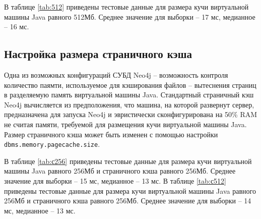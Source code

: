 В таблице \ref{tab:512} приведены тестовые данные для размера кучи виртуальной машины Java равного 512Мб. Среднее значение для выборки -- 17 мс, медианное -- 16 мс. 


\subsection{Настройка размера страничного кэша}

Одна из возможных конфигураций СУБД Neo4j -- возможность контроля количество паямти, используемое для  кэширования файлов -- вытеснения страниц в разделяемую память виртуальной машины Java. Стандартный страничный кэш Neo4j вычисляется из предположения, что машина, на которой развернут сервер, предназначена для запуска Neo4j и эвристически сконфигурирована на 50\% RAM не считая памяти, требуемой для размещения кучи виртуальной машины Java. Размер страничного кэша может быть изменен с помощью настройки \lstinline|dbms.memory.pagecache.size|.

В таблице \ref{tab:с256} приведены тестовые данные для размера кучи виртуальной машины Java равного 256Мб и страничного кэша равного 256Мб. Среднее значение для выборки -- 15 мс, медианное -- 13 мс. 
В таблице \ref{tab:с512} приведены тестовые данные для размера кучи виртуальной машины Java равного 256Мб и страничного кэша равного 256Мб. Среднее значение для выборки -- 14 мс, медианное -- 13 мс. 

